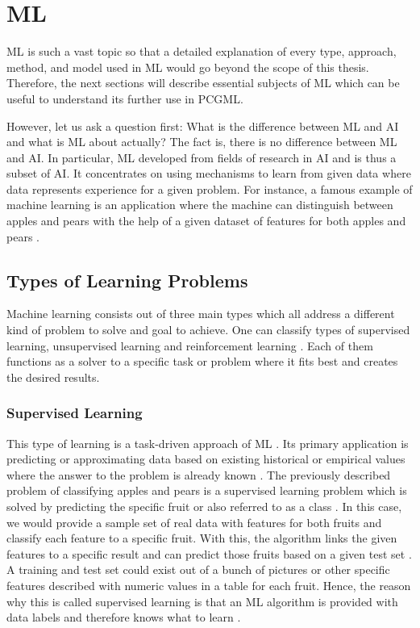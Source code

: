 \documentclass[MGS,Master,english]{twbook}%
\begin{document}
\chapter{\acl{ML}} \label{chapter::machineLearning}
\ac{ML} is such a vast topic so that a detailed explanation of every type, approach, method, and model used in ML would go beyond the scope of this thesis. Therefore, the next sections will describe essential subjects of ML which can be useful to understand its further use in PCGML. 

However, let us ask a question first: What is the difference between ML and AI and what is ML about actually? The fact is, there is no difference between ML and AI. In particular, ML developed from fields of research in AI and is thus a subset of AI. It concentrates on using mechanisms to learn from given data where data represents experience for a given problem. For instance, a famous example of machine learning is an application where the machine can distinguish between apples and pears with the help of a given dataset of features for both apples and pears \cite{ai::book}. 

\section{Types of Learning Problems}
Machine learning consists out of three main types which all address a different kind of problem to solve and goal to achieve. One can classify types of supervised learning, unsupervised learning and reinforcement learning \cite{ml::book::developer}. Each of them functions as a solver to a specific task or problem where it fits best and creates the desired results.

\subsection{Supervised Learning}
This type of learning is a task-driven approach of ML \cite{ml::book::developer}. Its primary application is predicting or approximating data based on existing historical or empirical values where the answer to the problem is already known \cite{ai::book}. The previously described problem of classifying apples and pears is a supervised learning problem which is solved by predicting the specific fruit or also referred to as a class \cite{ml::book::developer}. In this case, we would provide a sample set of real data with features for both fruits and classify each feature to a specific fruit. With this, the algorithm links the given features to a specific result and can predict those fruits based on a given test set \cite{ml::book::developer}. A training and test set could exist out of a bunch of pictures or other specific features described with numeric values in a table for each fruit. Hence, the reason why this is called supervised learning is that an ML algorithm is provided with data labels and therefore knows what to learn \cite{ai::book}.
\end{document}
